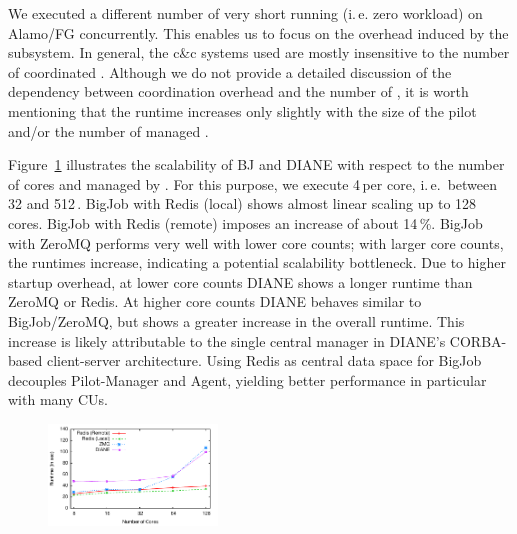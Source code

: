 \documentclass[conference]{IEEEtran}
\begin{document}

We executed a different number of very short running (i.\,e. zero
workload) \cus on Alamo/FG concurrently.  This enables us to focus on
the overhead induced by the \cc subsystem. In general, the c\&c
systems used are mostly insensitive to the number of coordinated \cus.
Although we do not provide a detailed discussion of the dependency
between coordination overhead and the number of \cus, it is worth
mentioning that the runtime increases only slightly with the size of
the pilot and/or the number of managed \cus.


Figure~\ref{fig:perf_bigjob-varying-cores}
illustrates the scalability of BJ and DIANE with respect to the number
of cores and \cus managed by \pilot. For this purpose, we execute
4\,\cus per core, i.\,e.\ between 32 and 512\,\cus.  BigJob with Redis
(local) shows almost linear scaling up to 128 cores. BigJob with Redis
(remote) imposes an increase of about 14\,\%. BigJob with ZeroMQ
performs very well with lower core counts; with larger core counts,
the runtimes increase, indicating a potential scalability
bottleneck. Due to higher startup overhead, at lower core counts DIANE
shows a longer runtime than ZeroMQ or Redis.  At higher core counts
DIANE behaves similar to BigJob/ZeroMQ, but shows a greater increase
in the overall runtime. This increase is likely attributable to the
single central manager in DIANE's CORBA-based client-server
architecture. Using Redis as central data space for BigJob decouples
Pilot-Manager and Agent, yielding better performance in particular
with many CUs. 

\begin{figure}[t] \centering \up\up
\includegraphics[width=0.4\textwidth]{../perf/bigjob-varying-cores-alamo-noadvert-scaled.pdf}
\upp \caption{}
\label{fig:perf_bigjob-varying-cores} \end{figure}
\end{document}
